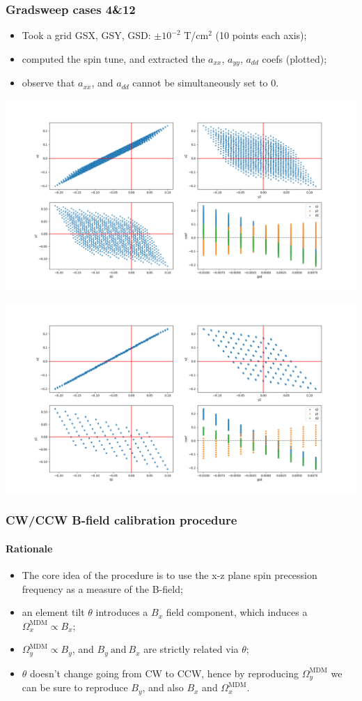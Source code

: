 \documentclass[pdf]{beamer}
\newcommand{\Wx}{\Omega_x}
\newcommand{\Wy}{\Omega_y}
\newcommand{\MDM}{^{\mathrm{MDM}}}
\begin{document}
	\begin{frame}\frametitle{Gradsweep cases 4\&12}
	\begin{minipage}{.3\textwidth}
		\begin{itemize}
			\item Took a grid GSX, GSY, GSD: $\pm 10^{-2}$ T/cm$^2$ (10 points each axis);
			\item computed the spin tune, and extracted the $a_{xx}$, $a_{yy}$, $a_{dd}$ coefs (plotted);
			\item observe that $a_{xx}$, and $a_{dd}$ cannot be simultaneously set to 0.
		\end{itemize}
	\end{minipage}
	\begin{minipage}{.65\textwidth}
		\centering
		\includegraphics[scale=.19]{decoh/gradsweep_4gsd}
		
		\includegraphics[scale=.19]{decoh/gradsweep_12gsd}
	\end{minipage}
	\end{frame}
	\begin{frame}
		\frametitle{CW/CCW B-field calibration procedure}
		\framesubtitle{Rationale}
		\begin{itemize}
			\item The core idea of the procedure is to use the x-z plane spin precession frequency as a measure of the B-field;
			\item an element tilt $\theta$ introduces a $B_x$ field component, which induces a $\Wx\MDM \propto B_x$;
			\item $\Wy\MDM \propto B_y$, and $B_y ~\text{and}~ B_x$ are strictly related via $\theta$;
			\item $\theta$ doesn't change going from CW to CCW, hence by reproducing $\Wy\MDM$ we can be sure to reproduce $B_y$, and also $B_x$ and $\Wx\MDM$.
		\end{itemize}
	\end{frame}
\end{document}
